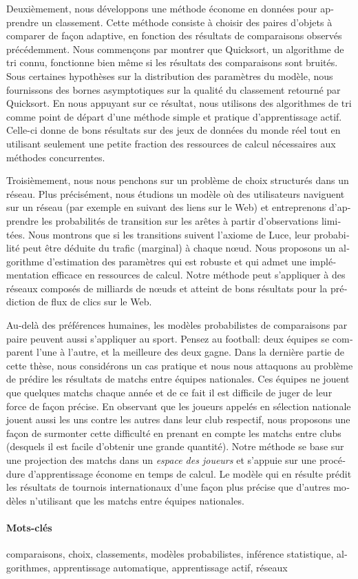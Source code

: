 \begin{otherlanguage}{french}
	Deuxièmement, nous développons une méthode économe en données pour apprendre un classement.
	Cette méthode consiste à choisir des paires d'objets à comparer de façon adaptive, en fonction des résultats de comparaisons observés précédemment.
	Nous commençons par montrer que Quicksort, un algorithme de tri connu, fonctionne bien même si les résultats des comparaisons sont bruités.
	Sous certaines hypothèses sur la distribution des paramètres du modèle, nous fournissons des bornes asymptotiques sur la qualité du classement retourné par Quicksort.
	En nous appuyant sur ce résultat, nous utilisons des algorithmes de tri comme point de départ d'une méthode simple et pratique d'apprentissage actif.
	Celle-ci donne de bons résultats sur des jeux de données du monde réel tout en utilisant seulement une petite fraction des ressources de calcul nécessaires aux méthodes concurrentes.

	Troisièmement, nous nous penchons sur un problème de choix structurés dans un réseau.
	Plus précisément, nous étudions un modèle où des utilisateurs naviguent sur un réseau (par exemple en suivant des liens sur le Web) et entreprenons d'apprendre les probabilités de transition sur les arêtes à partir d'observations limitées.
	Nous montrons que si les transitions suivent l'axiome de Luce, leur probabilité peut être déduite du trafic (marginal) à chaque nœud.
	Nous proposons un algorithme d'estimation des paramètres qui est robuste et qui admet une implémentation efficace en ressources de calcul.
	Notre méthode peut s'appliquer à des réseaux composés de milliards de nœuds et atteint de bons résultats pour la prédiction de flux de clics sur le Web.

	Au-delà des préférences humaines, les modèles probabilistes de comparaisons par paire peuvent aussi s'appliquer au sport.
	Pensez au football: deux équipes se comparent l'une à l'autre, et la meilleure des deux gagne.
	Dans la dernière partie de cette thèse, nous considérons un cas pratique et nous nous attaquons au problème de prédire les résultats de matchs entre équipes nationales.
	Ces équipes ne jouent que quelques matchs chaque année et de ce fait il est difficile de juger de leur force de façon précise.
	En observant que les joueurs appelés en sélection nationale jouent aussi les uns contre les autres dans leur club respectif, nous proposons une façon de surmonter cette difficulté en prenant en compte les matchs entre clubs (desquels il est facile d'obtenir une grande quantité).
	Notre méthode se base sur une projection des matchs dans un \emph{espace des joueurs} et s'appuie sur une procédure d'apprentissage économe en temps de calcul.
	Le modèle qui en résulte prédit les résultats de tournois internationaux d'une façon plus précise que d'autres modèles n'utilisant que les matchs entre équipes nationales.

	\paragraph{Mots-clés}
	comparaisons, choix, classements, modèles probabilistes, inférence statistique, algorithmes, apprentissage automatique, apprentissage actif, réseaux
\end{otherlanguage}
